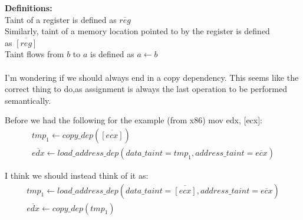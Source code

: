 \documentclass{article}
\begin{document}
{\bf Definitions:}\\
Taint of a register is defined as $\overline{reg}$\\
Similarly, taint of a memory location pointed to by the register is defined\\
as $\overline{[reg]}$ \\
Taint flows from $b$ to $a$ is defined as $a\leftarrow{b}$
\\\\
I'm wondering if we should always end in a copy dependency. This seems
like the correct thing to do,as assignment is always the last operation
to be performed semantically.

Before we had the following for the example (from x86) mov edx, [ecx]:
\begin{align*}
        tmp_1 \leftarrow copy\_dep(\overline{[ecx]})\\
        \overline{edx} \leftarrow load\_address\_dep(data\_taint=tmp_1, address\_taint=\overline{ecx})
\end{align*}

I think we should instead think of it as:
\begin{align*}
        tmp_1 \leftarrow load\_address\_dep(data\_taint=\overline{[ecx]}, address\_taint=\overline{ecx})\\
        \overline{edx} \leftarrow copy\_dep(tmp_1)
\end{align*}
\end{document}
